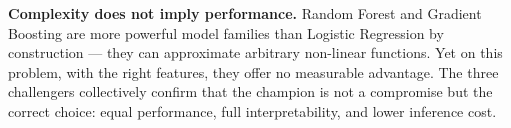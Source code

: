\documentclass[12pt,a4paper,openany]{report}
\begin{document}
\medskip
\textbf{Complexity does not imply performance.} Random Forest and Gradient Boosting
are more powerful model families than Logistic Regression by construction ---
they can approximate arbitrary non-linear functions. Yet on this problem, with
the right features, they offer no measurable advantage. The three challengers
collectively confirm that the champion is not a compromise but the correct
choice: equal performance, full interpretability, and lower inference cost.
\end{document}
